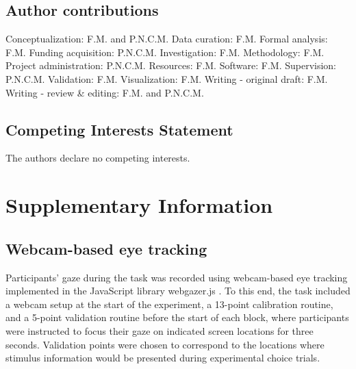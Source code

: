 \documentclass[11pt, a4paper, twocolumn, abstract]{scrartcl}
\begin{document}
\subsection*{Author contributions}

Conceptualization: F.M. and P.N.C.M. Data curation: F.M. Formal analysis: F.M. Funding acquisition: P.N.C.M. Investigation: F.M. Methodology: F.M. Project administration: P.N.C.M. Resources: F.M. Software: F.M. Supervision: P.N.C.M. Validation: F.M. Visualization: F.M. Writing - original draft: F.M. Writing - review \& editing: F.M. and P.N.C.M.

\subsection*{Competing Interests Statement}

The authors declare no competing interests.

\clearpage

\section*{Supplementary Information}
\label{sec:supplement}

\renewcommand{\thefigure}{S\arabic{figure}}
\setcounter{figure}{0} 

\renewcommand{\thetable}{S\arabic{table}}
\setcounter{table}{0} 

\subsection*{Webcam-based eye tracking}
\label{sec:eye-tracking}


Participants' gaze during the task was recorded using webcam-based eye tracking implemented in the JavaScript library webgazer.js \parencite{papoutsaki2016webgazer,yang2020WebcambasedOnlineEyetracking}. To this end, the task included a webcam setup at the start of the experiment, a 13-point calibration routine, and a 5-point validation routine before the start of each block, where participants were instructed to focus their gaze on indicated screen locations for three seconds. Validation points were chosen to correspond to the locations where stimulus information would be presented during experimental choice trials.
\end{document}
